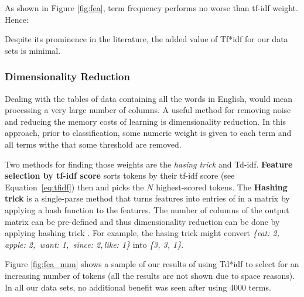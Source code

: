 \documentclass{sig-alternate-05-2015}
\newcommand{\eq}[1]{Equation~\ref{eq:#1}}
\theoremstyle{break}
\begin{document}

 
As shown in Figure \ref{fig:fea}, term frequency performs no worse     than tf-idf weight.  Hence:
\begin{lesson}
Despite its   prominence in the literature, the added value of Tf*idf for our
data sets is minimal.
\end{lesson}

\subsubsection{Dimensionality Reduction}


Dealing with the tables of data containing all the words in English, would mean processing a very large number of columns. A useful method for removing noise and reducing the 
memory costs of learning is dimensionality reduction. In this approach,
prior to classification, some numeric weight is given to each term and all terms withe that some threshold
are removed. 

Two methods for finding those weights are the {\em hasing trick} and {\ef Td-idf}.
\textbf{Feature selection by tf-idf score}  sorts tokens by their tf-idf score (see \eq{tfidf}) then and picks the $N$ highest-scored tokens. 
The \textbf{Hashing trick} is a single-parse method that turns features into 
entries of in a matrix by applying a hash function to the features. The number of columns of the output matrix can be pre-defined and thus dimensionality reduction can be done by applying hashing trick \cite{weinberger2009feature}. For
example,
the hasing trick might convert {\em {\em \{eat: 2,\, apple: 2,\, want: 1,\, since: 2,\,like: 1\}}} into {\em \{3, 3, 1\}}.   


Figure \ref{fig:fea_num}  shows a sample  of our results of using Td*idf to select for an increasing
number of tokens (all the results are not shown due to space reasons). In all our data sets,
no   additional benefit
  was seen after using 4000 terms. 
 
\end{document}
